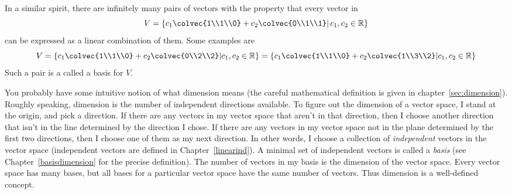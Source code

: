 In a similar spirit, there are infinitely many pairs of vectors with the property that every vector in 
\[V=\left\{  c_1\colvec{1\\1\\0} +c_2\colvec{0\\1\\1} \middle\vert \, c_1,c_2\in \mathbb{R} \right\} \] 
can be expressed as a linear combination of them. Some examples are 
\[V=
\left\{ c_1\colvec{1\\1\\0} +c_2\colvec{0\\2\\2}  \middle\vert c_1,c_2\in \mathbb{R} \right\} 
=\left\{c_1 \colvec{1\\1\\0}+c_2 \colvec{1\\3\\2}  \middle\vert c_1,c_2\in \mathbb{R} \right\} 
\]
Such a pair is a  called a basis for $V$.




You probably have some intuitive notion of what dimension means
(the careful mathematical definition is given in chapter~\ref{sec:dimension}).
Roughly speaking, dimension is the number of independent directions available.  To figure out the dimension of a vector space, I stand at the origin, and pick a direction.  If there are any vectors in my vector space that aren't in that direction, then I choose another direction that isn't in the line determined by the direction I chose.  If there are any vectors in my vector space not in the plane determined by the first two directions, then I choose one of them as my next direction.  In other words, I choose a collection of \emph{independent} vectors in the vector space (independent vectors are defined in Chapter~\ref{linearind}).  
A minimal set of independent vectors is called a {\itshape basis} (see Chapter~\ref{basisdimension} for the precise definition). 
The number of vectors in my basis is the dimension of the vector space. 
Every vector space has many bases, but all bases for a particular vector space have the same number of vectors. Thus dimension is a well-defined concept. 

